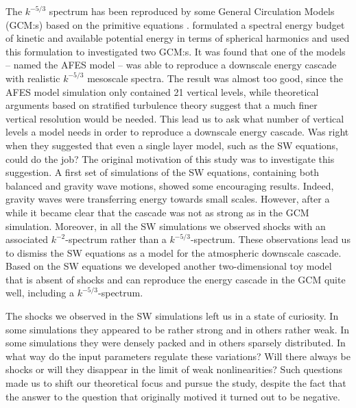 The $ k^{-5/3} $ spectrum has been reproduced 
 by some General Circulation Models (GCM:s) based on the primitive
equations \cite[]{KoshykHamilton2001, Skamarock2004,
Hamilton_etal2008}.  \cite{AugierLindborg2013}  formulated a spectral energy budget of kinetic and available potential energy in terms of spherical harmonics and used this formulation to investigated two GCM:s. It was found that one of the models -- named the AFES model -- was able to reproduce a downscale energy cascade with realistic $ k^{-5/3} $ mesoscale spectra. The result was almost too good, since the AFES model simulation only contained 21 vertical levels, while theoretical arguments based on stratified turbulence theory \cite[]{Lindborg2006} suggest that a much finer vertical resolution would be needed. This lead us to ask what number of vertical levels a model needs in order  to reproduce a downscale energy cascade. Was \cite{YuanHamilton1994}  right  when they suggested that even a single layer model, such as the SW equations, could do the job? 
The original motivation of this study was to investigate this suggestion. A first set of
simulations of the SW equations, containing both balanced and gravity wave motions,
showed some encouraging results. Indeed, gravity waves were transferring energy towards
small scales. However, after a while it became clear that the cascade was not as strong
as in the GCM simulation.  Moreover, in all the SW simulations we observed shocks with
an associated $ k^{-2} $-spectrum rather than a $ k^{-5/3} $-spectrum. These
observations lead us to dismiss the SW equations as a model for the atmospheric
downscale cascade. Based on the SW equations we developed another two-dimensional toy
model  \cite[]{LindborgMohanan2017} that is absent of shocks and can reproduce the
energy cascade in the GCM quite well, including a $ k^{-5/3}  $-spectrum.

The shocks we observed in the SW simulations left us in a state of curiosity. In some simulations they appeared to be rather strong and in others rather weak. In some simulations they were densely packed and in others sparsely distributed.
In what way  do the input parameters regulate these variations? Will there always be shocks or will they disappear in the limit of weak nonlinearities?  Such questions made us to shift our theoretical focus and pursue the study, despite the fact that the answer to the question that originally motived it turned out to be negative.  
 
